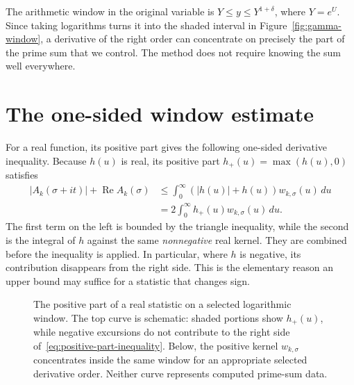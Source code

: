 \documentclass[11pt,openany,oneside]{scrbook}
\theoremstyle{definition}
\theoremstyle{remark}
\newcommand{\Rea}{\operatorname{Re}}
\begin{document}
The arithmetic window in the original variable is $Y\le y\le Y^{1+\delta}$, where $Y=e^U$.  Since taking logarithms turns it into the shaded interval in Figure~\ref{fig:gamma-window}, a derivative of the right order can concentrate on precisely the part of the prime sum that we control.  The method does not require knowing the sum well everywhere.

\section{The one-sided window estimate}\label{sec:one-sided-window}

For a real function, its positive part gives the following one-sided derivative inequality.  Because $h(u)$ is real, its positive part $h_+(u)=\max(h(u),0)$ satisfies
\begin{align}\label{eq:positive-part-inequality}
|A_k(\sigma+it)|+\Rea A_k(\sigma)
&\le\int_0^\infty (|h(u)|+h(u))w_{k,\sigma}(u)\,du\\
&=2\int_0^\infty h_+(u)w_{k,\sigma}(u)\,du.
\end{align}
The first term on the left is bounded by the triangle inequality, while the second is the integral of $h$ against the same \emph{nonnegative} real kernel.  They are combined before the inequality is applied.  In particular, where $h$ is negative, its contribution disappears from the right side.  This is the elementary reason an upper bound may suffice for a statistic that changes sign.

\begin{figure}[ht]
\centering

\caption{The positive part of a real statistic on a selected logarithmic window. The top curve is schematic: shaded portions show $h_+(u)$, while negative excursions do not contribute to the right side of~\eqref{eq:positive-part-inequality}. Below, the positive kernel $w_{k,\sigma}$ concentrates inside the same window for an appropriate selected derivative order. Neither curve represents computed prime-sum data.}
\label{fig:positive-part-window}
\end{figure}
\end{document}
